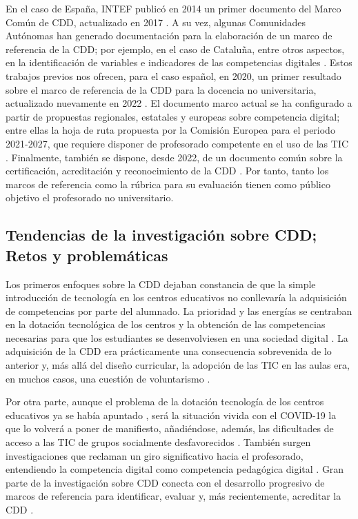 \documentclass[spanish]{textolivre}
\begin{document}
En el caso de España, INTEF publicó en 2014 un primer documento del Marco Común de CDD, actualizado en 2017 \cite{intef2017}. A su vez, algunas Comunidades Autónomas han generado documentación para la elaboración de un marco de referencia de la CDD; por ejemplo, en el caso de Cataluña, entre otros aspectos, en la identificación de variables e indicadores de las competencias digitales \cite{generalitat2018}. Estos trabajos previos nos ofrecen, para el caso español, en 2020, un primer resultado sobre el marco de referencia de la CDD para la docencia no universitaria, actualizado nuevamente en 2022 \cite{boe2020, boe2022a}. El documento marco actual se ha configurado a partir de propuestas regionales, estatales y europeas sobre competencia digital; entre ellas la hoja de ruta propuesta por la Comisión Europea para el periodo 2021-2027, que requiere disponer de profesorado competente en el uso de las TIC \cite{comisioneuropea2020}. Finalmente, también se dispone, desde 2022, de un documento común sobre la certificación, acreditación y reconocimiento de la CDD \cite{boe2022b}. Por tanto, tanto los marcos de referencia como la rúbrica para su evaluación tienen como público objetivo el profesorado no universitario.


\subsection{Tendencias de la investigación sobre CDD; Retos y problemáticas}\label{sec-1.3}
Los primeros enfoques sobre la CDD dejaban constancia de que la simple introducción de tecnología en los centros educativos no conllevaría la adquisición de competencias por parte del alumnado. La prioridad y las energías se centraban en la dotación tecnológica de los centros y la obtención de las competencias necesarias para que los estudiantes se desenvolviesen en una sociedad digital \cite{carrera2012, mork2014}. La adquisición de la CDD era prácticamente una consecuencia sobrevenida de lo anterior y, más allá del diseño curricular, la adopción de las TIC en las aulas era, en muchos casos, una cuestión de voluntarismo \cite{medina2015}.

Por otra parte, aunque el problema de la dotación tecnología de los centros educativos ya se había apuntado \cite{busquet2018}, será la situación vivida con el COVID-19 la que lo volverá a poner de manifiesto, añadiéndose, además, las dificultades de acceso a las TIC de grupos socialmente desfavorecidos \cite{hernandezortega2021}. También surgen investigaciones que reclaman un giro significativo hacia el profesorado, entendiendo la competencia digital como competencia pedagógica digital \cite{alvarez2015, area2012, lazaro2019}. Gran parte de la investigación sobre CDD conecta con el desarrollo progresivo de marcos de referencia para identificar, evaluar y, más recientemente, acreditar la CDD \cite{castaneda2018, colasbravo2021, martinezbravo2021}.
\end{document}
